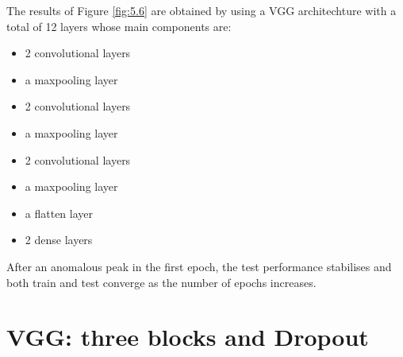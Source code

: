 \documentclass[10pt,english, openany]{book}
\begin{document}
The results of Figure \ref{fig:5.6} are obtained by using a VGG architechture with a total of 12 layers whose main components are:
\begin{itemize}
    \item 2 convolutional layers
    \item a maxpooling layer
    \item 2 convolutional layers
    \item a maxpooling layer
    \item 2 convolutional layers
    \item a maxpooling layer
    \item a flatten layer
    \item 2 dense layers
\end{itemize}
After an anomalous peak in the first epoch, the test performance stabilises and both train and test converge as the number of epochs increases.
\newpage
\section{VGG: three blocks and Dropout}
\end{document}
